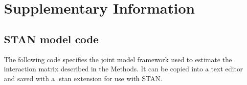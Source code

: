 \documentclass[a4,12pt]{article}
\begin{document}
\printbibliography   

\newpage 

\section{Supplementary Information}

    \subsection{STAN model code}

    The following code specifies the joint model framework used to estimate the interaction matrix described in the Methods. It can be copied into a text editor and saved with a .stan extension for use with STAN. 

    
\end{document}
